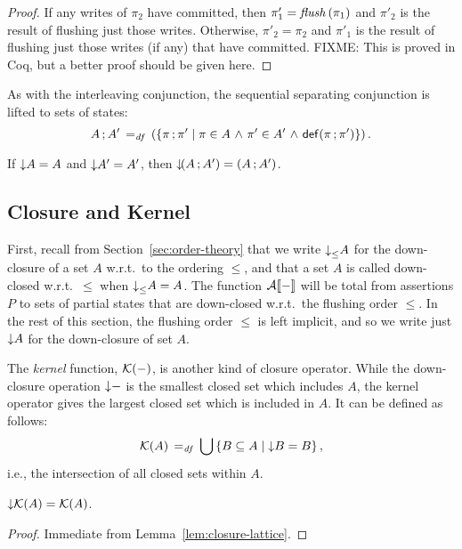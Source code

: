 \documentclass[11pt]{report}
\begin{document}
\begin{proof}
	If any writes of $\pi_2$ have committed, then $\pi'_1 = \mathit{flush}\left(\pi_1\right)$ and $\pi'_2$ is the result of flushing just those writes. Otherwise, $\pi'_2 = \pi_2$ and $\pi'_1$ is the result of flushing just those writes (if any) that have committed. FIXME: This is proved in Coq, but a better proof should be given here. 
\end{proof}

As with the interleaving conjunction, the sequential separating conjunction is lifted to sets of states: \[ A \operatorname{;} A' \operatorname{\;=_{\mathit{df}}\;} \left(\left\lbrace \pi \operatorname{;} \pi' \mid \pi \in A \operatorname{\,\wedge\,} \pi' \in A' \operatorname{\,\wedge\,} \mathsf{def}(\pi \operatorname{;} \pi') \right\rbrace\right).\] 

\begin{lemma}
	\label{lem:seq-closure}
	If $\operatorname{\downarrow}\!A = A$ and $\operatorname{\downarrow}\!A' = A'$, then $\operatorname{\downarrow}\!(A \operatorname{;} A') = (A \operatorname{;} A')$. 
\end{lemma}
	
\subsection{Closure and Kernel}

First, recall from Section~\ref{sec:order-theory} that we write $\operatorname{\downarrow}_{\leq}\!A$ for the down-closure of a set $A$ w.r.t.~to the ordering $\leq$, and that a set $A$ is called down-closed w.r.t.~$\leq$ when $\operatorname{\downarrow}_{\leq}\!A = A$. The function $\mathcal{A}[\![-]\!]$ will be total from assertions $P$ to sets of partial states that are down-closed w.r.t.~the flushing order $\leq$. In the rest of this section, the flushing order $\leq$ is left implicit, and so we write just $\operatorname{\downarrow}\!A$ for the down-closure of set $A$.

The \emph{kernel} function, $\mathcal{K}(-)$, is another kind of closure operator. While the down-closure operation $\operatorname{\downarrow}\!-$ is the smallest closed set which includes $A$, the kernel operator gives the largest closed set which is included in $A$. It can be defined as follows: \begin{equation}
	\mathcal{K}(A) \operatorname{\;=_{\mathit{df}}\;} \bigcup \left\lbrace B \subseteq A \mid \operatorname{\downarrow}\!B = B \right\rbrace,
\end{equation} i.e., the intersection of all closed sets within $A$. 

\begin{lemma}
	\label{lem:kernel-closure}
	$\operatorname{\downarrow}\!\mathcal{K}(A) = \mathcal{K}(A)$. 	
\end{lemma}

\begin{proof}
	Immediate from Lemma~\ref{lem:closure-lattice}. 
\end{proof}
\end{document}
